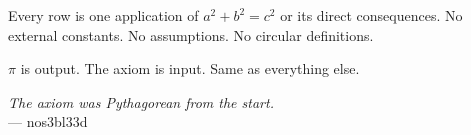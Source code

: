 \documentclass[11pt,a4paper]{article}
\theoremstyle{plain}
\theoremstyle{definition}
\begin{document}
Every row is one application of $a^2 + b^2 = c^2$ or its direct consequences.
No external constants. No assumptions. No circular definitions.

$\pi$ is output. The axiom is input. Same as everything else.

\bigskip
\begin{center}
\emph{The axiom was Pythagorean from the start.}\\[4pt]
--- nos3bl33d
\end{center}
\end{document}

